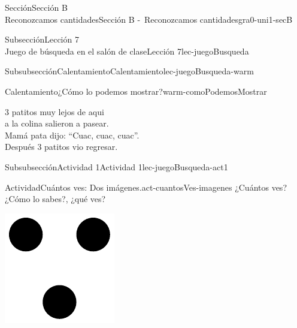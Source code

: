 \begin{sectionptx}{Sección}{{\Large Sección B\\}Reconozcamos cantidades}{}{Sección B -~Reconozcamos cantidades}{}{}{gra0-uni1-secB}
\begin{subsectionptx}{Subsección}{{\normalsize Lección 7\\[-0.05cm]}Juego de búsqueda en el salón de clase}{}{Lección 7}{}{}{lec-juegoBusqueda}
\begin{subsubsectionptx}{Subsubsección}{Calentamiento}{}{Calentamiento}{}{}{lec-juegoBusqueda-warm}
\begin{exploration}{Calentamiento}{¿Cómo lo podemos mostrar?}{warm-comoPodemosMostrar}
\begin{image}{0.0}{1}{0.0}{}
\end{image}%
%
\par
3 patitos muy lejos de aqui\\
 a la colina salieron a pasear.\\
 Mamá pata dijo: “Cuac, cuac, cuac”.\\
 Después 3 patitos vio regresar.%
\end{exploration}%
\end{subsubsectionptx}
%
%
\typeout{************************************************}
\typeout{************************************************}
%
\clearpage
\begin{subsubsectionptx}{Subsubsección}{Actividad 1}{}{Actividad 1}{}{}{lec-juegoBusqueda-act1}
\begin{activity}{Actividad}{Cuántos ves: Dos imágenes.}{act-cuantosVes-imagenes}%
¿Cuántos ves?\\
 ¿Cómo lo sabes?, ¿qué ves?%
\begin{sidebyside}{2}{0}{0}{0}%
\begin{sbspanel}{0.5}%
\includegraphics[max width=\linewidth, center]{external/svg-source/tikz-file-148152.pdf}
\end{sbspanel}%
\begin{sbspanel}{0.5}%

\end{sbspanel}
\end{sidebyside}
\end{activity}
\end{subsubsectionptx}
\end{subsectionptx}
\end{sectionptx}

